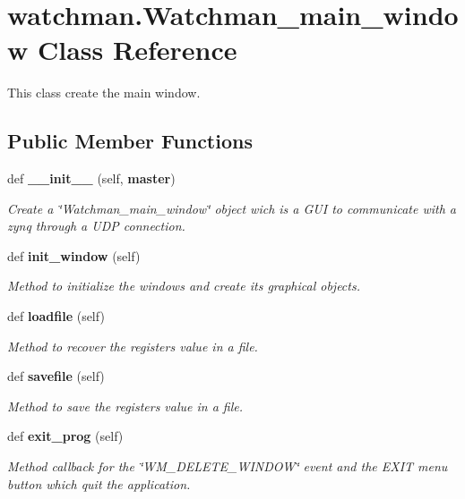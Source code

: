 \section{watchman.\+Watchman\+\_\+main\+\_\+window Class Reference}
\label{classwatchman_1_1_watchman__main__window}


This class create the main window.  


\subsection*{Public Member Functions}
\begin{DoxyCompactItemize}
\item 
def \textbf{ \+\_\+\+\_\+init\+\_\+\+\_\+} (self, \textbf{ master})
\begin{DoxyCompactList}\small\item\em Create a \char`\"{}\+Watchman\+\_\+main\+\_\+window\char`\"{} object wich is a G\+UI to communicate with a zynq through a U\+DP connection. \end{DoxyCompactList}\item 
def \textbf{ init\+\_\+window} (self)
\begin{DoxyCompactList}\small\item\em Method to initialize the windows and create its graphical objects. \end{DoxyCompactList}\item 
def \textbf{ loadfile} (self)
\begin{DoxyCompactList}\small\item\em Method to recover the register\textquotesingle{}s value in a file. \end{DoxyCompactList}\item 
def \textbf{ savefile} (self)
\begin{DoxyCompactList}\small\item\em Method to save the register\textquotesingle{}s value in a file. \end{DoxyCompactList}\item 
def \textbf{ exit\+\_\+prog} (self)
\begin{DoxyCompactList}\small\item\em Method callback for the \char`\"{}\+W\+M\+\_\+\+D\+E\+L\+E\+T\+E\+\_\+\+W\+I\+N\+D\+O\+W\char`\"{} event and the E\+X\+IT menu button which quit the application. \end{DoxyCompactList}\item 

\end{DoxyCompactItemize}
